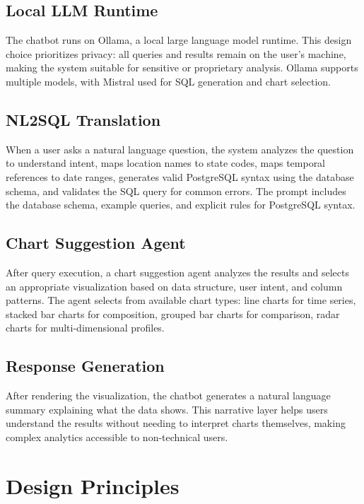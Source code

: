 \subsection{Local LLM Runtime}

The chatbot runs on Ollama, a local large language model runtime. This design choice prioritizes privacy: all queries and results remain on the user's machine, making the system suitable for sensitive or proprietary analysis. Ollama supports multiple models, with Mistral used for SQL generation and chart selection.

\subsection{NL2SQL Translation}

When a user asks a natural language question, the system analyzes the question to understand intent, maps location names to state codes, maps temporal references to date ranges, generates valid PostgreSQL syntax using the database schema, and validates the SQL query for common errors. The prompt includes the database schema, example queries, and explicit rules for PostgreSQL syntax.

\subsection{Chart Suggestion Agent}

After query execution, a chart suggestion agent analyzes the results and selects an appropriate visualization based on data structure, user intent, and column patterns. The agent selects from available chart types: line charts for time series, stacked bar charts for composition, grouped bar charts for comparison, radar charts for multi-dimensional profiles.

\subsection{Response Generation}

After rendering the visualization, the chatbot generates a natural language summary explaining what the data shows. This narrative layer helps users understand the results without needing to interpret charts themselves, making complex analytics accessible to non-technical users.


\section{Design Principles}

